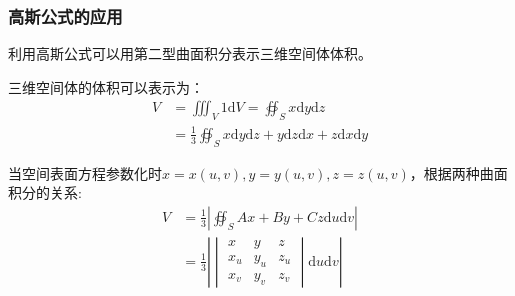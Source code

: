 \documentclass{ctexart}
\begin{document}
\subsubsection{高斯公式的应用}
利用高斯公式可以用第二型曲面积分表示三维空间体体积。
\begin{tcolorbox}[
    colback=bac1,     %
    colframe=fra1,   %
    coltitle=white,             %
    coltext=tex1,
    title=三维空间体的体积,
    fonttitle=\bfseries,        %
arc=3mm,                     %
breakable
]
三维空间体的体积可以表示为：
\begin{align*} 
  V&=\iiint_V1\mathrm{d}V=\oiint_S x\mathrm{d}y\mathrm{d}z  \\
&=\frac{1}{3}\oiint_Sx\mathrm{d}y\mathrm{d}z+y\mathrm{d}z\mathrm{d}x+z\mathrm{d}x\mathrm{d}y       \tag{3-8}
\end{align*}
\end{tcolorbox}

当空间表面方程参数化时$x=x(u,v),y=y(u,v),z=z(u,v)$，根据两种曲面积分的关系:
\begin{align*} 
  V
&=\frac{1}{3}\left|\oiint_S Ax+By+Cz\mathrm{d}u
\mathrm{d}v\right|\\
&=\frac{1}{3}\left|\begin{vmatrix}
 x & y & z\\
 x_u & y_u& z_u\\
 x_v & y_v &z_v
\end{vmatrix}  \mathrm{d}u\mathrm{d}v \right|\tag{3-9}      
\end{align*}
\end{document}
